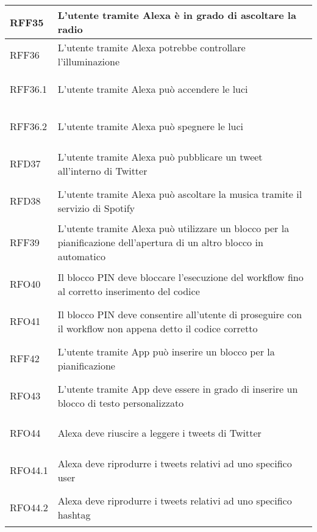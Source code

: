 \begin{longtable}{|>{\centering}m{5em}|m{25em}|}
	\hypertarget{RFF35}{RFF35} & L'utente tramite Alexa è in grado di ascoltare la radio\\ \hline
	
	\hypertarget{RFF36}{RFF36} & L'utente tramite Alexa potrebbe controllare l'illuminazione\\ \hline
	
	\hypertarget{RFF36.1}{RFF36.1} & L'utente tramite Alexa può accendere le luci\\ \hline
	
	\hypertarget{RFF36.2}{RFF36.2} & L'utente tramite Alexa può spegnere le luci\\ \hline
	
	\hypertarget{RFD37}{RFD37} & L'utente tramite Alexa può pubblicare un tweet all'interno di Twitter\\ \hline
	
	\hypertarget{RFD38}{RFD38} & L'utente tramite Alexa può ascoltare la musica tramite il servizio di Spotify\\ \hline
	
	\hypertarget{RFF39}{RFF39} & L'utente tramite Alexa può utilizzare un blocco per la pianificazione dell'apertura di un altro blocco in automatico\\ \hline
	
	\hypertarget{RFO40}{RFO40} & Il blocco PIN deve bloccare l'esecuzione del workflow fino al corretto inserimento del codice\\ \hline
	
	\hypertarget{RFO41}{RFO41} & Il blocco PIN deve consentire all'utente di proseguire con il workflow non appena detto il codice corretto\\ \hline
	
	\hypertarget{RFF42}{RFF42} & L'utente tramite App può inserire un blocco per la pianificazione\\ \hline
	
	\hypertarget{RFO43}{RFO43} & L'utente tramite App deve essere in grado di inserire un blocco di testo personalizzato\\ \hline
	
	\hypertarget{RFO44}{RFO44} & Alexa deve riuscire a leggere i tweets di Twitter\\ \hline
	
	\hypertarget{RFO44.1}{RFO44.1} & Alexa deve riprodurre i tweets relativi ad uno specifico user\\ \hline
	
	\hypertarget{RFO44.2}{RFO44.2} & Alexa deve riprodurre i tweets relativi ad uno specifico hashtag\\ \hline
	

\end{longtable}
